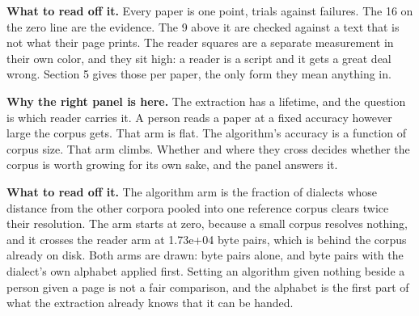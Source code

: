 \textbf{What to read off it.} Every paper is one point, trials against failures. The 16 on the zero line are the evidence. The 9 above it are checked against a text that is not what their page prints. The reader squares are a separate measurement in their own color, and they sit high: a reader is a script and it gets a great deal wrong. Section 5 gives those per paper, the only form they mean anything in.

\textbf{Why the right panel is here.} The extraction has a lifetime, and the question is which reader carries it. A person reads a paper at a fixed accuracy however large the corpus gets. That arm is flat. The algorithm's accuracy is a function of corpus size. That arm climbs. Whether and where they cross decides whether the corpus is worth growing for its own sake, and the panel answers it.

\textbf{What to read off it.} The algorithm arm is the fraction of dialects whose distance from the other corpora pooled into one reference corpus clears twice their resolution. The arm starts at zero, because a small corpus resolves nothing, and it crosses the reader arm at 1.73e+04 byte pairs, which is behind the corpus already on disk. Both arms are drawn: byte pairs alone, and byte pairs with the dialect's own alphabet applied first. Setting an algorithm given nothing beside a person given a page is not a fair comparison, and the alphabet is the first part of what the extraction already knows that it can be handed.

